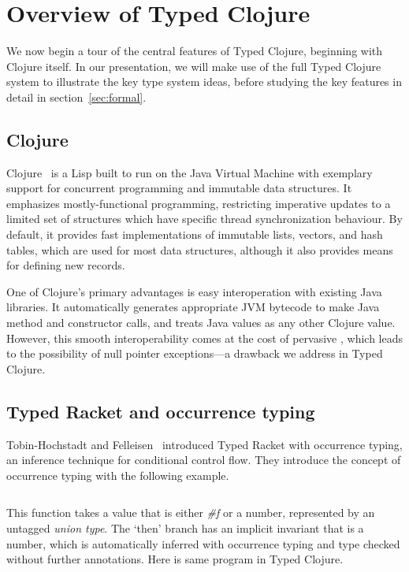 \section{Overview of Typed Clojure}

\label{sec:overview}

We now begin a tour of the central features of Typed Clojure,
beginning with Clojure itself. In our presentation, we will make 
use of the full Typed Clojure system to illustrate the key type system
ideas, before studying the key features in detail in
section~\ref{sec:formal}. 

\subsection{Clojure}

Clojure~\cite{Hic08} is a Lisp built to run on the
Java Virtual Machine with exemplary support for concurrent programming
and immutable data structures. It emphasizes mostly-functional
programming, restricting imperative updates to a limited set of
structures which have specific thread synchronization behaviour. By
default, it provides fast implementations of immutable lists, vectors,
and hash tables, which are used for most data structures, although it
also provides means for defining new records.

One of Clojure's primary advantages is easy interoperation with
existing Java libraries. It automatically generates appropriate JVM
bytecode to make Java method and constructor calls, and treats Java
values as any other Clojure value. However, this smooth
interoperability comes at the cost of pervasive , which
leads to the possibility of null pointer exceptions---a drawback we
address in Typed Clojure.

\subsection{Typed Racket and occurrence typing}

Tobin-Hochstadt and Felleisen~\cite{TF10}
introduced Typed Racket with occurrence typing,
an inference technique for conditional control flow.
They introduce the concept of occurrence typing 
with the following example.

\inputminted[firstline=1]{racket}{code/tr/example1.rkt}

This function takes a value that is either \emph{\#f} %
or a number, represented by an untagged \emph{union type}.
The `then' branch has an implicit invariant
that  is a number, which is automatically inferred with occurrence typing
and type checked without further annotations.
Here is same program in Typed Clojure.

